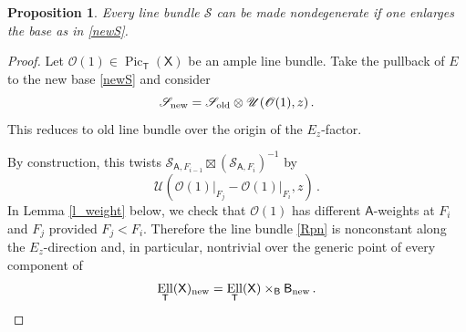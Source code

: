 \documentclass[14pt]{extarticle}
\newcommand{\Z}{\mathbb{Z}}
\newcommand{\bT}{\mathsf{T}}
\newcommand{\bA}{\mathsf{A}}
\newcommand{\bZ}{\mathsf{Z}}
\newcommand{\bB}{\mathsf{B}}
\newcommand{\bX}{\mathsf{X}}
\newcommand{\cU}{\mathscr{U}}
\newcommand{\cE}{\mathscr{E}}
\newcommand{\cB}{\mathscr{B}}
\newcommand{\cC}{\mathscr{C}}
\newcommand{\du}{\boldsymbol{\delta\upsilon}}
\newcommand{\cS}{\mathscr{S}}
\newcommand{\cO}{\mathscr{O}}
\newcommand{\idz}{1_{\cE_\bZ}}
\DeclareMathOperator{\Coh}{Coh}
\DeclareMathOperator{\Ell}{Ell}
\DeclareMathOperator{\Pic}{Pic}
\newtheorem{Proposition}[Lemma]{Proposition}
\theoremstyle{definition}
\begin{document}
 


\subsubsection{}

\begin{Proposition}\label{p_newS} 
Every line bundle $\cS$ can be made nondegenerate if one enlarges the
base as in \eqref{newS}. 
\end{Proposition}

\begin{proof}
  Let $\cO(1)\in \Pic_\bT(\bX)$ be an ample line bundle. Take the
  pullback of $E$ to the new base \eqref{newS}  and consider
  $$
  \cS_\textup{new} = \cS_\textup{old} \otimes \cU(\cO(1), z) \,. 
  $$
  This reduces to old line bundle over the origin of the 
  $E_z$-factor.

 By construction, this twists $\cS_{\bA,F_{i-1}} \boxtimes \left(
      \cS_{\bA,F_i} \right)^{-1}$ by 
 \begin{equation}
  \label{Rpn}
   \cU\left(\cO(1)\big|_{F_j} - \cO(1)\big|_{F_i} ,z\right) \,. 
 \end{equation}
In Lemma \ref{l_weight} below, we check that $\cO(1)$ has different $\bA$-weights
  at $F_i$ and $F_j$ provided $F_j < F_i$. Therefore the line bundle \eqref{Rpn}
  is nonconstant along the $E_z$-direction and, in particular,
  nontrivial over the generic point of every component of
  $$
  \Ell_\bT(\bX)_\textup{new} =  \Ell_\bT(\bX) \times_\bB
  \bB_\textup{new}
  \,.
  $$
  \end{proof}


\end{document}
